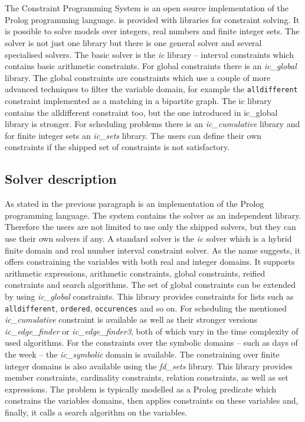\section{\eclipse}

The \eclipse Constraint Programming System is an open source implementation of 
the Prolog programming language. \eclipse is provided with libraries for constraint 
solving. It is possible to solve models over integers, real numbers and finite 
integer sets. The solver is not just one library but there is one general solver 
and several specialised solvers. The basic solver is the {\em ic} library -- interval 
constraints which contains basic arithmetic constraints. For global constraints there 
is an {\em ic\_global} library. The global constraints are constraints
which use a couple of more advanced techniques to filter the variable domain, for example 
the \texttt{alldifferent} constraint implemented as a matching in a bipartite graph.
The ic library contains the alldifferent constraint too, but the one introduced in
ic\_global library is stronger. For scheduling problems there is an {\em ic\_cumulative}
library and for finite integer sets an {\em ic\_sets} library. The users can define their own
constraints if the shipped set of constraints is not satisfactory.

\subsection{Solver description}
As stated in the previous paragraph \eclipse is an implementation of the Prolog programming language.
The system contains the solver as an independent library. Therefore the users are not 
limited to use only the shipped solvers, but they can use their own solvers if any.
A standard solver is the {\em ic} solver which is a hybrid finite domain and real number 
interval constraint solver. As the name suggests, it offers constraining the variables with
both real and integer domains. It supports arithmetic expressions, arithmetic constraints,
global constraints, reified constraints and search algorithms. The set of global constraints
can be extended by using {\em ic\_global} constraints. This library provides constraints
for lists such as \texttt{alldifferent}, \texttt{ordered}, \texttt{occurences} and so on.
For scheduling the mentioned {\em ic\_cumulative} constraint is available as well as 
their stronger versions {\em ic\_edge\_finder} or {\em ic\_ed\-ge\_fin\-der3}, both of which
vary in the time complexity of used algorithms. For the constraints over the symbolic 
domains -- such as days of the week -- the {\em ic\_symbolic} domain is available.  The 
constraining over finite integer domains is also available using the {\em fd\_sets} library.
This library provides member constraints, cardinality constraints, relation constraints,
as well as set expressions. The problem is typically modelled as a Prolog predicate 
which constrains the variables domains, then applies constraints on these variables 
and, finally, it calls a search algorithm on the variables. 

